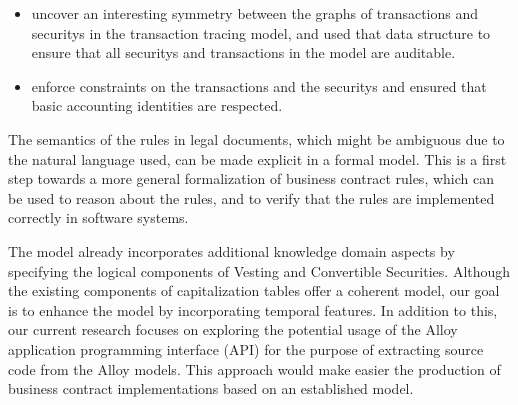 \begin{itemize}
	\item uncover an interesting symmetry between the graphs of \glspl{transaction} and \glspl{security} in the transaction tracing model, and used that data structure to ensure that all \glspl{security} and transactions in the model are auditable.
	\item enforce constraints on the \glspl{transaction} and the \glspl{security} and ensured that basic accounting identities are respected.
\end{itemize}

The semantics of the rules in legal documents, which might be ambiguous due to the natural language used, can be made explicit in a formal model. This is a first step towards a more general formalization of business contract rules, which can be used to reason about the rules, and to verify that the rules are implemented correctly in software systems.

The model already incorporates additional knowledge domain aspects by specifying the logical components of Vesting and Convertible Securities. Although the existing components of capitalization tables offer a coherent model, our goal is to enhance the model by incorporating temporal features. In addition to this, our current research focuses on exploring the potential usage of the Alloy application programming interface (API) for the purpose of extracting source code from the Alloy models. This approach would make easier the production of business contract implementations based on an established model.

